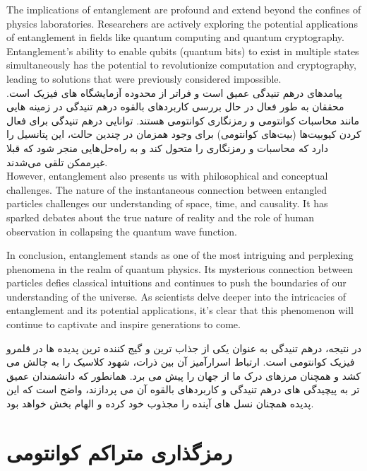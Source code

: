 \documentclass{book}
\begin{document}
The implications of entanglement are profound and extend beyond the confines of physics laboratories. Researchers are actively exploring the potential applications of entanglement in fields like quantum computing and quantum cryptography. Entanglement's ability to enable qubits (quantum bits) to exist in multiple states simultaneously has the potential to revolutionize computation and cryptography, leading to solutions that were previously considered impossible.\\
پیامدهای درهم تنیدگی عمیق است و فراتر از محدوده آزمایشگاه های فیزیک است. محققان به طور فعال در حال بررسی کاربردهای بالقوه درهم تنیدگی در زمینه هایی مانند محاسبات کوانتومی و رمزنگاری کوانتومی هستند. توانایی درهم تنیدگی برای فعال کردن کیوبیت‌ها (بیت‌های کوانتومی) برای وجود همزمان در چندین حالت، این پتانسیل را دارد که محاسبات و رمزنگاری را متحول کند و به راه‌حل‌هایی منجر شود که قبلا غیرممکن تلقی می‌شدند.\\

However, entanglement also presents us with philosophical and conceptual challenges. The nature of the instantaneous connection between entangled particles challenges our understanding of space, time, and causality. It has sparked debates about the true nature of reality and the role of human observation in collapsing the quantum wave function.

In conclusion, entanglement stands as one of the most intriguing and perplexing phenomena in the realm of quantum physics. Its mysterious connection between particles defies classical intuitions and continues to push the boundaries of our understanding of the universe. As scientists delve deeper into the intricacies of entanglement and its potential applications, it's clear that this phenomenon will continue to captivate and inspire generations to come.

در نتیجه، درهم تنیدگی به عنوان یکی از جذاب ترین و گیج کننده ترین پدیده ها در قلمرو فیزیک کوانتومی است. ارتباط اسرارآمیز آن بین ذرات، شهود کلاسیک را به چالش می کشد و همچنان مرزهای درک ما از جهان را پیش می برد. همانطور که دانشمندان عمیق تر به پیچیدگی های درهم تنیدگی و کاربردهای بالقوه آن می پردازند، واضح است که این پدیده همچنان نسل های آینده را مجذوب خود کرده و الهام بخش خواهد بود.


\newpage



\section{رمزگذاری متراکم کوانتومی}
\end{document}
